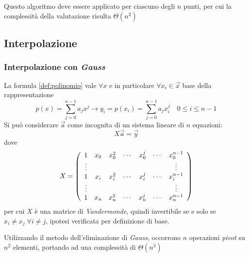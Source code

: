 Questo algoritmo deve essere applicato per ciascuno degli $n$ punti, per cui la complessità della valutazione risulta $\Theta \left( n^2 \right)$

\subsection{Interpolazione}
\subsubsection{Interpolazione con \textit{Gauss}}
La formula \ref{def:polinomio} vale $\forall x$ e in particolare $\forall x_i \in \vec{x}$ base della rappresentazione
\begin{equation*}
    p(x) = \sum_{j=0}^{n-1}a_j x^j
    \rightarrow y_i = p(x_i) = \sum_{j=0}^{n-1}a_j x_i^j
    \quad 0 \leq i \leq n-1
\end{equation*}
Si può considerare $\vec{a}$ come incognita di un sistema lineare di $n$ equazioni:
\begin{equation*}
    X \vec{a} = \vec{y}
\end{equation*}
dove
\begin{equation*}
    X = \left( 
        \begin{array}[h]{ccccccc}
            1 & x_0 & x_0^2 & \cdots & x_0^j & \cdots & x_0^{n-1} \\
            \vdots &&&&&& \vdots\\
            1 & x_i & x_i^2 & \cdots & x_i^j & \cdots & x_i^{n-1} \\
            \vdots &&&&&& \vdots\\
            1 & x_n & x_n^2 & \cdots & x_n^j & \cdots & x_n^{n-1} 
        \end{array}
    \right)
\end{equation*}
per cui $X$ è una matrice di \textit{Vandermonde}, quindi invertibile se e solo se $x_i \neq x_j \; \forall i\neq j$, ipotesi verificata per definizione di base.

Utilizzando il metodo dell'eliminazione di \textit{Gauss}, occorrono $n$ operazioni \textit{pivot} su $n^2$ elementi, portando ad una complessità di $\Theta \left( n^3 \right)$

